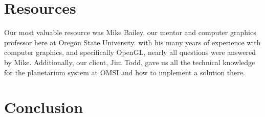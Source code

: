 \documentclass[onecolumn, draftclsnofoot,10pt, compsoc]{IEEEtran}
\begin{document}


\section{Resources}

Our most valuable resource was Mike Bailey, our mentor and computer graphics professor here at Oregon State University. with his many years of experience with computer graphics, and specifically OpenGL, nearly all questions were answered by Mike. Additionally, our client, Jim Todd, gave us all the technical knowledge for the planetarium system at OMSI and how to implement a solution there. 

 
 
\section{Conclusion}

\end{document}
